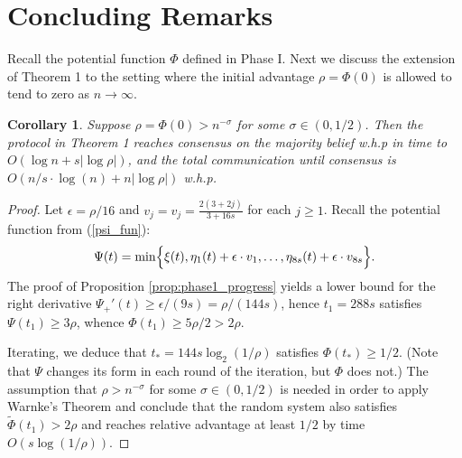 \documentclass[a4paper,12pt]{article}
\newtheorem{corollary}{Corollary}
\begin{document}
\section{Concluding Remarks}

Recall the potential function $\Phi$ defined in Phase I. Next we discuss the extension of Theorem 1 to the setting where the initial advantage $\rho=\Phi(0)$ is allowed to tend to zero as $n \to \infty$.
\begin{corollary} Suppose $\rho=\Phi(0)>n^{-\sigma}$ for some $\sigma \in (0,1/2)$.
Then the protocol in Theorem 1 reaches consensus on the majority belief w.h.p in  time to $O(\log{n} +s|\log\rho|)$, and the total communication until consensus is $O(n/s \cdot \log(n)+ n |\log \rho|)$ w.h.p.
\end{corollary}
\begin{proof}
Let $\epsilon=\rho/16$ and $v_j= v_j  = \frac{2(3+ 2j)}{3+16s}$ for each $j \geq 1$. Recall the potential function from (\ref{psi_fun}):
\begin{align} 
\Psi(t) = \min\Bigl\{ \xi(t), \eta_1(t) + \epsilon \cdot v_1, \ldots, \eta_{8s}(t) + \epsilon \cdot v_{8s} \Bigr\}.
\end{align}
The proof of Proposition \ref{prop:phase1_progress} yields a lower bound for the right derivative
$\Psi_{+}'(t)  \ge \epsilon/(9s)=\rho/(144s)$, hence $t_1=288s$ satisfies
$\Psi(t_1) \ge 3\rho$, whence $\Phi(t_1)  \ge 5\rho/2>2\rho$. 

Iterating, we deduce that
$t_*=144s \log_2(1/\rho)$ satisfies $\Phi(t_*) \ge 1/2$. 
(Note that $\Psi$ changes its form in each round of the iteration, but $\Phi$ does not.) 
The assumption that $\rho>n^{-\sigma}$ for some $\sigma \in (0,1/2)$ is needed in order to apply Warnke's Theorem and conclude that the random system also satisfies $\tilde{\Phi}(t_1)>2\rho$ and reaches relative advantage at least $1/2$ by time $O(s\log(1/\rho))$.
\end{proof}





\end{document}
